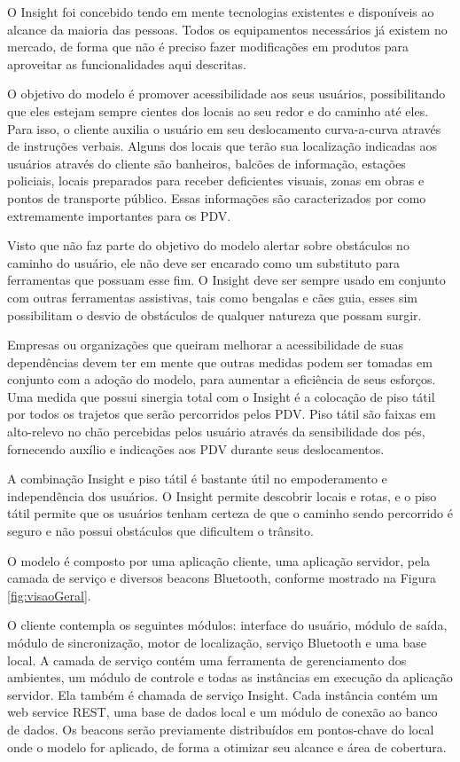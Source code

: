 \documentclass[english,brazilian]{UNISINOSmonografia}
\begin{document}
O Insight foi concebido tendo em mente tecnologias existentes e disponíveis ao alcance da maioria das pessoas. Todos os equipamentos necessários já existem no mercado, de forma que não é preciso fazer modificações em produtos para aproveitar as funcionalidades aqui descritas.

O objetivo do modelo é promover acessibilidade aos seus usuários, possibilitando que eles estejam sempre cientes dos locais ao seu redor e do caminho até eles. Para isso, o cliente auxilia o usuário em seu deslocamento curva-a-curva através de instruções verbais. Alguns dos locais que terão sua localização indicadas aos usuários através do cliente são banheiros, balcões de informação, estações policiais, locais preparados para receber deficientes visuais, zonas em obras e pontos de transporte público. Essas informações são caracterizados por  como extremamente importantes para os PDV.

Visto que não faz parte do objetivo do modelo alertar sobre obstáculos no caminho do usuário, ele não deve ser encarado como um substituto para ferramentas que possuam esse fim. O Insight deve ser sempre usado em conjunto com outras ferramentas assistivas, tais como bengalas e cães guia, esses sim possibilitam o desvio de obstáculos de qualquer natureza que possam surgir. 

Empresas ou organizações que queiram melhorar a acessibilidade de suas dependências devem ter em mente que outras medidas podem ser tomadas em conjunto com a adoção do modelo, para aumentar a eficiência de seus esforços. Uma medida que possui sinergia total com o Insight é a colocação de piso tátil por todos os trajetos que serão percorridos pelos PDV. Piso tátil são faixas em alto-relevo no chão percebidas pelos usuário através da sensibilidade dos pés, fornecendo auxílio e indicações aos PDV durante seus deslocamentos.

A combinação Insight e piso tátil é bastante útil no empoderamento e independência dos usuários. O Insight permite descobrir locais e rotas, e o piso tátil permite que os usuários tenham certeza de que o caminho sendo percorrido é seguro e não possui obstáculos que dificultem o trânsito.

O modelo é composto por uma aplicação cliente, uma aplicação servidor, pela camada de serviço e diversos beacons Bluetooth, conforme mostrado na Figura \ref{fig:visaoGeral}. 

O cliente contempla os seguintes módulos: interface do usuário, módulo de saída, módulo de sincronização, motor de localização, serviço Bluetooth e uma base local. 
A camada de serviço contém uma ferramenta de gerenciamento dos ambientes, um módulo de controle e todas as instâncias em execução da aplicação servidor. Ela também é chamada de serviço Insight.
Cada instância contém um web service REST, uma base de dados local e um módulo de conexão ao banco de dados. 
Os beacons serão previamente distribuídos em pontos-chave do local onde o modelo for aplicado, de forma a otimizar seu alcance e área de cobertura.
\end{document}
